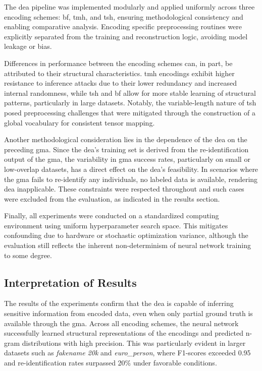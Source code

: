 The \ac{dea} pipeline was implemented modularly and applied uniformly across three encoding schemes: \ac{bf}, \ac{tmh}, and \ac{tsh}, ensuring methodological consistency and enabling comparative analysis.
Encoding specific preprocessing routines were explicitly separated from the training and reconstruction logic, avoiding model leakage or bias.

Differences in performance between the encoding schemes can, in part, be attributed to their structural characteristics.
\ac{tmh} encodings exhibit higher resistance to inference attacks due to their lower redundancy and increased internal randomness, while \ac{tsh} and \ac{bf} allow for more stable learning of structural patterns, particularly in large datasets.
Notably, the variable-length nature of \ac{tsh} posed preprocessing challenges that were mitigated through the construction of a global vocabulary for consistent tensor mapping.

Another methodological consideration lies in the dependence of the \ac{dea} on the preceding \ac{gma}.
Since the \ac{dea}'s training set is derived from the re-identification output of the \ac{gma}, the variability in \ac{gma} success rates, particularly on small or low-overlap datasets, has a direct effect on the \ac{dea}'s feasibility.
In scenarios where the \ac{gma} fails to re-identify any individuals, no labeled data is available, rendering \ac{dea} inapplicable.
These constraints were respected throughout and such cases were excluded from the evaluation, as indicated in the results section.

Finally, all experiments were conducted on a standardized computing environment using uniform hyperparameter search space.
This mitigates confounding due to hardware or stochastic optimization variance, although the evaluation still reflects the inherent non-determinism of neural network training to some degree.


\subsection{Interpretation of Results}

The results of the experiments confirm that the \ac{dea} is capable of inferring sensitive information from encoded data, even when only partial ground truth is available through the \ac{gma}.
Across all encoding schemes, the neural network successfully learned structural representations of the encodings and predicted n-gram distributions with high precision.
This was particularly evident in larger datasets such as \textit{fakename 20k} and \textit{euro\_person}, where F1-scores exceeded 0.95 and re-identification rates surpassed 20\% under favorable conditions.

